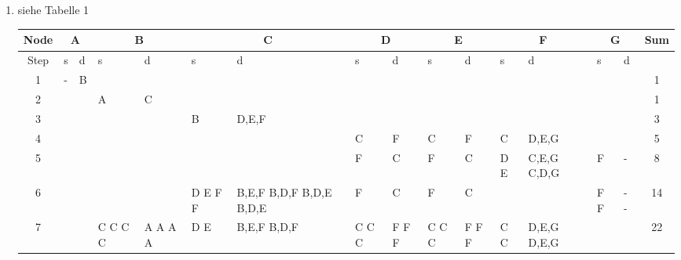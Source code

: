 \documentclass[a4paper,
			llpt,
			solution,
			accentcolor=tud2d,
			colorbacktitle
			]
			{tudexercise}
\newcommand{\8}{$\infty$}
\begin{document}
\subsection{}
\begin{enumerate}

\item siehe Tabelle 1
\begin{table}[ht]
\begin{tabular}{|c|p{0.7cm}|p{0.7cm}|p{0.7cm}|p{0.7cm}|p{0.7cm}|p{0.8cm}|p{0.8cm}|p{0.8cm}|p{0.8cm}|p{0.7cm}|p{0.7cm}|p{0.7cm}|p{0.7cm}|p{0.7cm}|c|}
\hline
Node & \multicolumn{2}{c|}{A} & \multicolumn{2}{c|}{B} & \multicolumn{2}{c|}{C} & \multicolumn{2}{c|}{D} & \multicolumn{2}{c|}{E} & \multicolumn{2}{c|}{F} & \multicolumn{2}{c|}{G} & Sum \\ \hline
Step & s & d & s  & d & s & d & s & d & s & d & s & d & s & d &  \\ \hline
1 & - & B &  &  &  &  &  &  &  &  &  &  &  &  & 1 \\ \hline
2 &  &  & A & C &  &  &  &  &  &  &  &  &  &  & 1 \\ \hline
3 &  &  &  &  & B & D,E,F &  &  &  &  &  &  &  &  & 3 \\ \hline
4 &  &  &  &  &  &  & C & F & C & F & C & D,E,G &  &  & 5 \\ \hline
5 &  &  &   &  &  &  & F & C & F & C & D \newline E & C,E,G \newline C,D,G & F & - & 8\\ \hline
6 &  &  &   &  & D \newline E \newline F \newline F & B,E,F \newline B,D,F \newline B,D,E \newline B,D,E & F & C & F & C &  &  & F \newline F& - \newline - &  14\\ \hline
7 &  &  & C \newline C \newline C \newline C & A \newline A \newline A \newline A & D \newline E & B,E,F \newline B,D,F & C \newline C \newline C & F \newline F \newline F & C \newline C \newline C & F \newline F \newline F & C \newline C & D,E,G \newline D,E,G &  &  & 22 \\ \hline

\end{tabular}
\end{table}
\end{enumerate}
\end{document}
